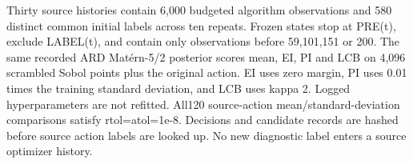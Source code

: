 \documentclass[suppldata]{interact}
\begin{document}
Thirty source histories contain 6,000 budgeted algorithm observations and 580 distinct common initial labels across ten repeats. Frozen states stop at PRE(t), exclude LABEL(t), and contain only observations before 59,101,151 or 200. The same recorded ARD Matérn-5/2 posterior scores mean, EI, PI and LCB on 4,096 scrambled Sobol points plus the original action. EI uses zero margin, PI uses 0.01 times the training standard deviation, and LCB uses kappa 2. Logged hyperparameters are not refitted. All120 source-action mean/standard-deviation comparisons satisfy rtol=atol=1e-8. Decisions and candidate records are hashed before source action labels are looked up. No new diagnostic label enters a source optimizer history.

\FloatBarrier\begingroup\fontsize{8.5}{10.5}\selectfont\setlength\tabcolsep{3pt}
\end{document}
